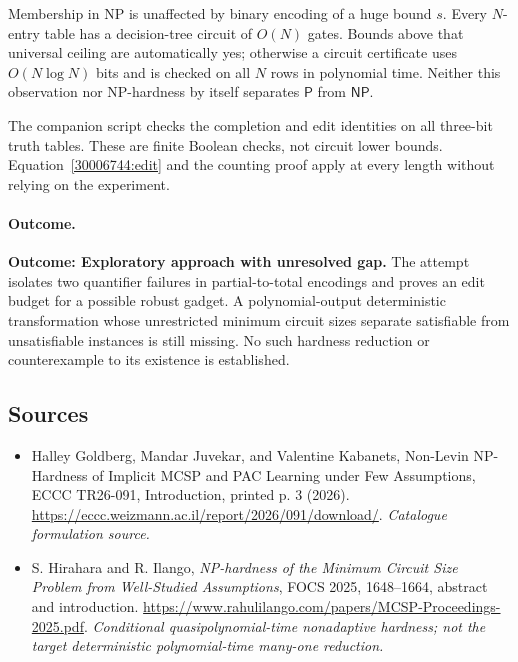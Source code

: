 \documentclass[11pt,a4paper]{article}
\numberwithin{equation}{section}
\begin{document}
Membership in NP is unaffected by binary encoding of a huge bound $s$.
Every $N$-entry table has a decision-tree circuit of $O(N)$ gates. Bounds
above that universal ceiling are automatically yes; otherwise a circuit
certificate uses $O(N\log N)$ bits and is checked on all $N$ rows in
polynomial time. Neither this observation nor NP-hardness by itself
separates $\mathsf P$ from $\mathsf{NP}$.

The companion script checks the completion and edit identities on all
three-bit truth tables. These are finite Boolean checks, not circuit lower
bounds. Equation~\eqref{30006744:edit} and the counting proof apply at every
length without relying on the experiment.

\paragraph{Outcome.}
\textbf{Outcome: Exploratory approach with unresolved gap.}
The attempt isolates two quantifier failures in partial-to-total encodings
and proves an edit budget for a possible robust gadget. A polynomial-output
deterministic transformation whose unrestricted minimum circuit sizes
separate satisfiable from unsatisfiable instances is still missing. No such
hardness reduction or counterexample to its existence is established.

\subsection{Sources}
\begin{itemize}\raggedright
\item[\textnormal{[S1]}]\hypertarget{source:30006744:1}{} Halley Goldberg, Mandar Juvekar, and Valentine Kabanets, Non-Levin NP-Hardness of Implicit MCSP and PAC Learning under Few Assumptions, ECCC TR26-091, Introduction, printed p. 3 (2026).
\url{https://eccc.weizmann.ac.il/report/2026/091/download/}.
{\small\textit{Catalogue formulation source.}}
\item[\textnormal{[E1]}]\hypertarget{extra:30006744:1}{} S. Hirahara and R. Ilango,
\emph{NP-hardness of the Minimum Circuit Size Problem from Well-Studied
Assumptions}, FOCS 2025, 1648--1664, abstract and introduction.
\url{https://www.rahulilango.com/papers/MCSP-Proceedings-2025.pdf}.
{\small\textit{Conditional quasipolynomial-time nonadaptive hardness;
not the target deterministic polynomial-time many-one reduction.}}

\end{itemize}
\end{document}
